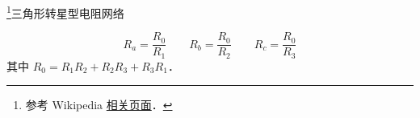 
\footnote{参考 Wikipedia \href{https://en.wikipedia.org/wiki/Y-Δ_transform}{相关页面}．}三角形转星型电阻网络

\begin{equation}
R_a = \frac{R_0}{R_1} \qquad
R_b = \frac{R_0}{R_2} \qquad
R_c = \frac{R_0}{R_3}
\end{equation}
其中 $R_0 = R_1 R_2 + R_2 R_3 + R_3 R_1$．
